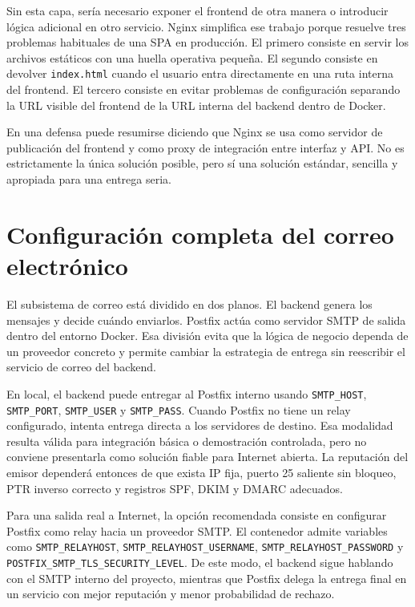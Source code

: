 \documentclass[11pt, a4paper]{article}
\begin{document}
Sin esta capa, sería necesario exponer el frontend de otra manera o introducir lógica adicional en otro servicio. Nginx simplifica ese trabajo porque resuelve tres problemas habituales de una SPA en producción. El primero consiste en servir los archivos estáticos con una huella operativa pequeña. El segundo consiste en devolver \texttt{index.html} cuando el usuario entra directamente en una ruta interna del frontend. El tercero consiste en evitar problemas de configuración separando la URL visible del frontend de la URL interna del backend dentro de Docker.

En una defensa puede resumirse diciendo que Nginx se usa como servidor de publicación del frontend y como proxy de integración entre interfaz y API. No es estrictamente la única solución posible, pero sí una solución estándar, sencilla y apropiada para una entrega seria.

\section{Configuración completa del correo electrónico}

El subsistema de correo está dividido en dos planos. El backend genera los mensajes y decide cuándo enviarlos. Postfix actúa como servidor SMTP de salida dentro del entorno Docker. Esa división evita que la lógica de negocio dependa de un proveedor concreto y permite cambiar la estrategia de entrega sin reescribir el servicio de correo del backend.

En local, el backend puede entregar al Postfix interno usando \texttt{SMTP\_HOST}, \texttt{SMTP\_PORT}, \texttt{SMTP\_USER} y \texttt{SMTP\_PASS}. Cuando Postfix no tiene un relay configurado, intenta entrega directa a los servidores de destino. Esa modalidad resulta válida para integración básica o demostración controlada, pero no conviene presentarla como solución fiable para Internet abierta. La reputación del emisor dependerá entonces de que exista IP fija, puerto 25 saliente sin bloqueo, PTR inverso correcto y registros SPF, DKIM y DMARC adecuados.

Para una salida real a Internet, la opción recomendada consiste en configurar Postfix como relay hacia un proveedor SMTP. El contenedor admite variables como \texttt{SMTP\_RELAYHOST}, \texttt{SMTP\_RELAYHOST\_USERNAME}, \texttt{SMTP\_RELAYHOST\_PASSWORD} y \texttt{POSTFIX\_SMTP\_TLS\_SECURITY\_LEVEL}. De este modo, el backend sigue hablando con el SMTP interno del proyecto, mientras que Postfix delega la entrega final en un servicio con mejor reputación y menor probabilidad de rechazo.
\end{document}
